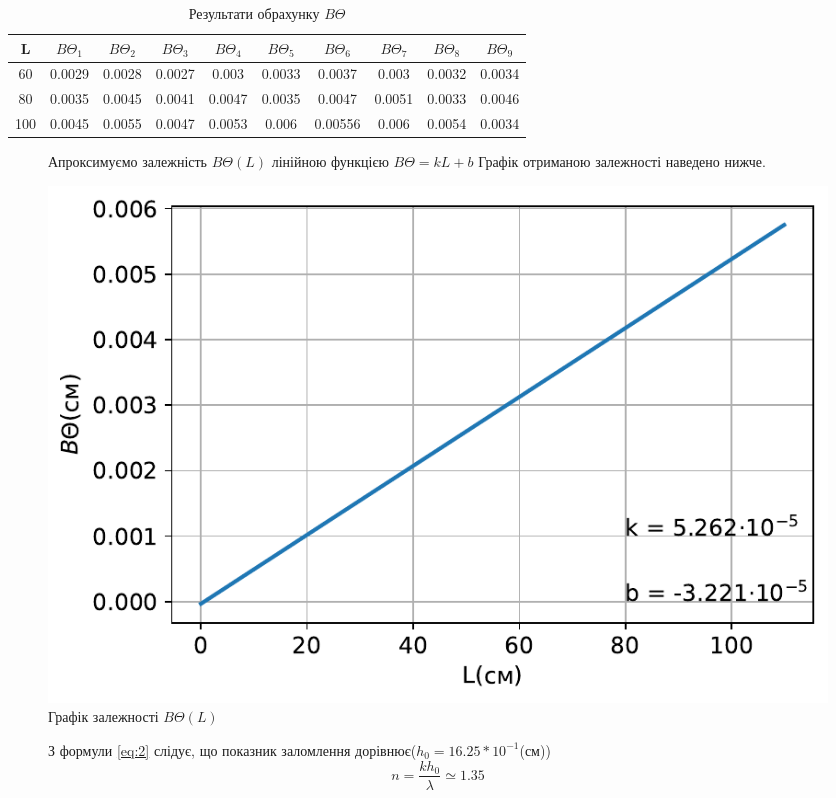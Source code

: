 \begin{table}[h!]
    \centering
    \begin{tabular}{|c|c|c|c|c|c|c|c|c|c|}
        \hline
        \textbf{L} & $B\Theta_1$ & $B\Theta_2$ & $B\Theta_3$ & $B\Theta_4$ & $B\Theta_5$ & $B\Theta_6$ & $B\Theta_7$ & $B\Theta_8$ & $B\Theta_9$ \\
        \hline
        60 & 0.0029 & 0.0028 & 0.0027 & 0.003 & 0.0033 & 0.0037 & 0.003 & 0.0032 & 0.0034 \\
        \hline
        80 & 0.0035 & 0.0045 & 0.0041 & 0.0047 & 0.0035 & 0.0047 & 0.0051 & 0.0033 & 0.0046 \\
        \hline
        100 & 0.0045 & 0.0055 & 0.0047 & 0.0053 & 0.006 & 0.00556 & 0.006 & 0.0054 & 0.0034 \\
        \hline
    \end{tabular}
    
    \caption{Результати обрахунку $B\Theta$}
\end{table}

\begin{figure}[h!]
    Апроксимуємо залежність $B\Theta(L)$ лінійною функцією $B\Theta = k L + b$
    Графік отриманою залежності наведено нижче.
\end{figure}



\begin{figure}[h!]    
    \centering
    \includegraphics[width=.6\textwidth]{assets/BQ(l).pdf}
    \caption{Графік залежності $B\Theta(L)$}
\end{figure}



\begin{figure}[h!]
    З формули \ref{eq:2} слідує, що показник заломлення дорівнює($h_0 = 16.25*10^{-1}$(см))
    $$ n = \frac{kh_0}{\lambda} \simeq 1.35 $$
    \vspace{1mm}
\end{figure}
